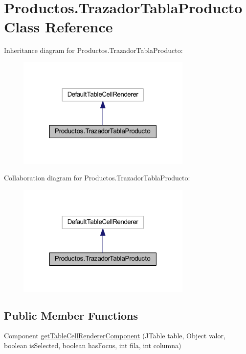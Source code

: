 \hypertarget{class_productos_1_1_trazador_tabla_producto}{}\section{Productos.\+Trazador\+Tabla\+Producto Class Reference}
\label{class_productos_1_1_trazador_tabla_producto}


Inheritance diagram for Productos.\+Trazador\+Tabla\+Producto\+:
\nopagebreak
\begin{figure}[H]
\begin{center}
\leavevmode
\includegraphics[width=244pt]{class_productos_1_1_trazador_tabla_producto__inherit__graph}
\end{center}
\end{figure}


Collaboration diagram for Productos.\+Trazador\+Tabla\+Producto\+:
\nopagebreak
\begin{figure}[H]
\begin{center}
\leavevmode
\includegraphics[width=244pt]{class_productos_1_1_trazador_tabla_producto__coll__graph}
\end{center}
\end{figure}
\subsection*{Public Member Functions}
\begin{DoxyCompactItemize}
\item 
Component \mbox{\hyperlink{class_productos_1_1_trazador_tabla_producto_a8a749273ee90f9861310a8eb9f5179be}{get\+Table\+Cell\+Renderer\+Component}} (J\+Table table, Object valor, boolean is\+Selected, boolean has\+Focus, int fila, int columna)
\end{DoxyCompactItemize}


